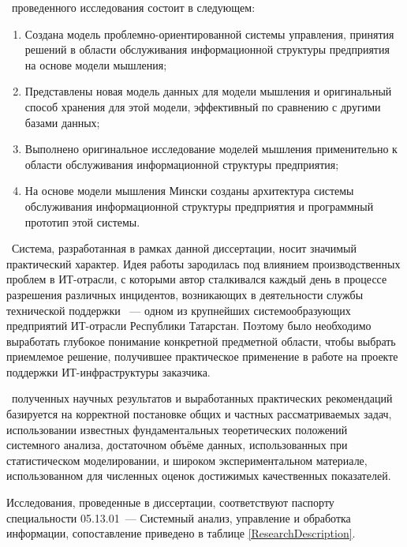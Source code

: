 \novelty\ проведенного исследования состоит в следующем:
\begin{enumerate}
  \item Создана модель проблемно-ориентированной системы управления, принятия решений в области обслуживания информационной структуры предприятия на основе модели мышления;
  \item Представлены новая модель данных для модели мышления и оригинальный способ хранения для этой модели, эффективный по сравнению с другими базами данных;
  \item Выполнено оригинальное исследование моделей мышления применительно к области обслуживания информационной структуры предприятия;
  \item На основе модели мышления Мински созданы архитектура системы обслуживания информационной структуры предприятия и программный прототип этой системы.
\end{enumerate}

\influence\ 
Система, разработанная в рамках данной диссертации, носит значимый практический характер. Идея работы зародилась под влиянием производственных проблем в ИТ-отрасли, с которыми автор сталкивался каждый день в процессе разрешения различных инцидентов, возникающих в деятельности службы технической поддержки \icl~--- одном из крупнейших системообразующих предприятий ИТ-отрасли Республики Татарстан. Поэтому было необходимо выработать глубокое понимание конкретной предметной области, чтобы выбрать приемлемое решение, получившее практическое применение в работе на проекте поддержки ИТ-инфраструктуры заказчика. \par
\reliability\ полученных научных результатов и выработанных практических рекомендаций базируется на корректной постановке общих и частных рассматриваемых задач,  использовании известных фундаментальных теоретических положений системного анализа, достаточном объёме данных, использованных при статистическом моделировании, и широком экспериментальном материале, использованном для численных оценок достижимых качественных показателей. \par 
Исследования, проведенные в диссертации, соответствуют паспорту специальности 05.13.01~--- Системный анализ, управление и обработка информации, сопоставление приведено в таблице \ref{ResearchDescription}.

